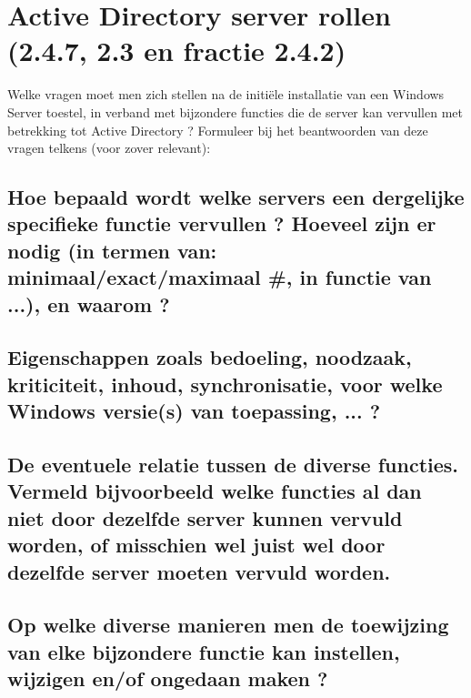 \chapter{Active Directory server rollen (2.4.7, 2.3 en fractie 2.4.2)}
Welke vragen moet men zich stellen na de initiële installatie van een Windows Server toestel, in verband met bijzondere functies die de server kan vervullen met betrekking tot Active Directory ? Formuleer bij het beantwoorden van deze vragen telkens (voor zover relevant):

\section{Hoe bepaald wordt welke servers een dergelijke specifieke functie vervullen ? Hoeveel zijn er nodig (in termen van: minimaal/exact/maximaal #, in functie van ...), en waarom ?}

\section{Eigenschappen zoals bedoeling, noodzaak, kriticiteit, inhoud, synchronisatie, voor welke Windows versie(s) van toepassing, ... ?}

\section{De eventuele relatie tussen de diverse functies. Vermeld bijvoorbeeld welke functies al dan niet door dezelfde server kunnen vervuld worden, of misschien wel juist wel door dezelfde server moeten vervuld worden.}

\section{Op welke diverse manieren men de toewijzing van elke bijzondere functie kan instellen, wijzigen en/of ongedaan maken ?}